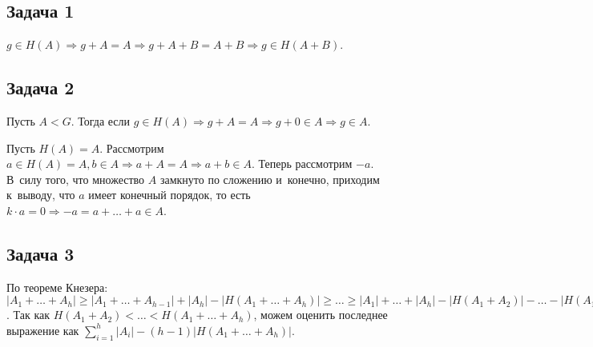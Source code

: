 \documentclass{article}
\begin{document}
\subsection*{Задача 1}
	$g \in H(A) \Rightarrow g + A = A \Rightarrow g + A + B = A + B \Rightarrow g
	\in H(A + B)$.

\subsection*{Задача 2}
	Пусть $A < G$. Тогда если $g \in H(A) \Rightarrow g + A = A \Rightarrow g + 0
	\in A \Rightarrow g \in A$.

	Пусть $H(A) = A$. Рассмотрим $a \in H(A) = A, b \in A \Rightarrow a + A = A
	\Rightarrow a +	b \in A$. Теперь рассмотрим $-a$. В~силу того, что множество
	$A$ замкнуто по сложению и~конечно, приходим к~выводу, что $a$ имеет конечный
	порядок, то есть $k \cdot a = 0 \Rightarrow -a = a + \ldots + a \in A$.

\subsection*{Задача 3}
	По теореме Кнезера:
	$|A_1 + \ldots + A_h| \ge |A_1 + \ldots + A_{h-1}| + |A_h| - |H(A_1 + \ldots
	+ A_h)| \ge \ldots \ge |A_1| + \ldots + |A_h| - |H(A_1 + A_2)| - \ldots
	- |H(A_1 + \ldots + A_h)|$. Так как $H(A_1 + A_2) < \ldots < H(A_1 + \ldots +
	A_h)$, можем оценить последнее выражение как $\sum\limits_{i=1}^h |A_i| -
	(h-1) |H(A_1 + \ldots + A_h)|$.
\end{document}
